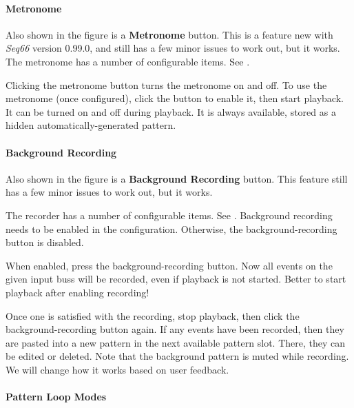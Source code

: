 \paragraph{Metronome}
\label{paragraph:patterns_metronome}

   Also shown in the figure is a \textbf{Metronome} button.
   This is a feature new with \textsl{Seq66} version 0.99.0, and still has a few
   minor issues to work out, but it works.
   The metronome has a number of configurable items.
   See .

   Clicking the metronome button turns the metronome on and off.
   To use the metronome (once configured), click the button to enable it,
   then start playback.
   It can be turned on and off during playback.
   It is always available, stored as a hidden automatically-generated
   pattern.

\paragraph{Background Recording}
\label{paragraph:patterns_background_recording}

   Also shown in the figure is a \textbf{Background Recording} button.
   This feature still has a few
   minor issues to work out, but it works.

   The recorder has a number of configurable items.
   See .
   Background recording needs to be enabled in the configuration.
   Otherwise, the background-recording button is disabled.

   When enabled, press the background-recording button.  Now all events on the
   given input buss will be recorded, even if playback is not started.
   Better to start playback after enabling recording!

   Once one is satisfied with the recording, stop playback, then
   click the background-recording button again.
   If any events have been recorded, then they are pasted into a new pattern in
   the next available pattern slot.
   There, they can be edited or deleted.
   Note that the background pattern is muted while recording.
   We will change how it works based on user feedback.

\paragraph{Pattern Loop Modes}
\label{paragraph:patterns_loop_modes}

